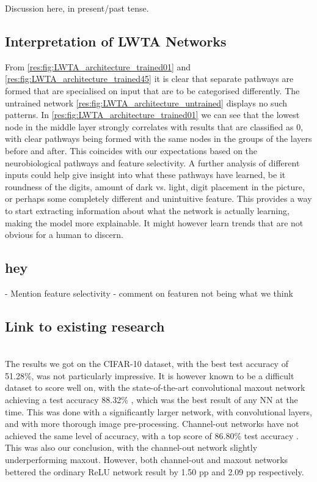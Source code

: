 Discussion here, in present/past tense.

\subsection{Interpretation of LWTA Networks}
    From \cref{res:fig:LWTA_architecture_trained01} and \cref{res:fig:LWTA_architecture_trained45} it is clear that separate pathways are formed that are specialised on input that are to be categorised differently. The untrained network \cref{res:fig:LWTA_architecture_untrained} displays no such patterns. In \cref{res:fig:LWTA_architecture_trained01} we can see that the lowest node in the middle layer strongly correlates with results that are classified as 0, with clear pathways being formed with the same nodes in the groups of the layers before and after. This coincides with our expectations based on the neurobiological pathways and feature selectivity. A further analysis of different inputs could help give insight into what these pathways have learned, be it roundness of the digits, amount of dark vs. light, digit placement in the picture, or perhaps some completely different and unintuitive feature. This provides a way to start extracting information about what the network is actually learning, making the model more explainable. It might however learn trends that are not obvious for a human to discern. 



\subsection{hey}
 - Mention feature selectivity
 - comment on featuren not being what we think

\subsection{Link to existing research}
     \\
    The results we got on the CIFAR-10 dataset, with the best test accuracy of 51.28\%, was not particularly impressive. It is however known to be a difficult dataset to score well on, with the state-of-the-art convolutional maxout network achieving a test accuracy 88.32\% \citep{Maxout_Networks}, which was the best result of any NN at the time. This was done with a significantly larger network, with convolutional layers, and with more thorough image pre-processing. Channel-out networks have not achieved the same level of accuracy, with a top score of 86.80\% test accuracy \citep{Wang}. This was also our conclusion, with the channel-out network slightly underperforming maxout. However, both channel-out and maxout networks bettered the ordinary ReLU network result by 1.50 pp and 2.09 pp respectively.


